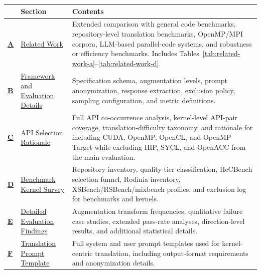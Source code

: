 \begin{center}
\small
\renewcommand{\arraystretch}{1.15}
\setlength{\tabcolsep}{5pt}

\newlength{\appendixsectionwidth}
\settowidth{\appendixsectionwidth}{Supplementary Tables and Figures\quad}

\begin{tabularx}{0.98\textwidth}{@{}
>{\bfseries}p{}
>{\RaggedRight\arraybackslash}p{\appendixsectionwidth}
X
@{}}
\toprule
\textbf{} & \textbf{Section} & \textbf{Contents} \\
\midrule

\hyperref[sec:appendix-d]{A}
& \hyperref[sec:appendix-d]{Related Work}
& Extended comparison with general code benchmarks, repository-level translation benchmarks,
OpenMP/MPI corpora, LLM-based parallel-code systems, and robustness or efficiency benchmarks.
Includes Tables~\ref{tab:related-work-a}--\ref{tab:related-work-d}. \\

\hyperref[sec:appendix-a]{B}
& \hyperref[sec:appendix-a]{Framework and Evaluation Details}
& Specification schema, augmentation levels, prompt anonymization, response extraction,
\knownfail{} exclusion policy, sampling configuration, and metric definitions. \\

\hyperref[sec:appendix-b]{C}
& \hyperref[sec:appendix-b]{API Selection Rationale}
& Full API co-occurrence analysis, kernel-level API-pair coverage, translation-difficulty taxonomy,
and rationale for including CUDA, OpenMP, OpenCL, and OpenMP Target while excluding HIP,
SYCL, and OpenACC from the main evaluation. \\

\hyperref[sec:appendix-c]{D}
& \hyperref[sec:appendix-c]{Benchmark Kernel Survey}
& Repository inventory, quality-tier classification, HeCBench selection funnel, Rodinia inventory,
XSBench/RSBench/mixbench profiles, and exclusion log for benchmarks and kernels. \\

\hyperref[sec:appendix-e]{E}
& \hyperref[sec:appendix-e]{Detailed Evaluation Findings}
& Augmentation transform frequencies, qualitative failure case studies, extended pass-rate analyses,
direction-level results, and additional statistical details. \\

\hyperref[sec:appendix-g]{F}
& \hyperref[sec:appendix-g]{Translation Prompt Template}
& Full system and user prompt templates used for kernel-centric translation, including output-format
requirements and anonymization details. \\


\end{tabularx}
\end{center}

